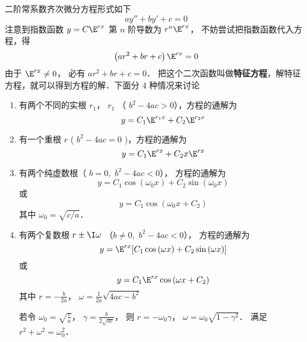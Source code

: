 

二阶常系数齐次微分方程形式如下
\begin{equation}
ay'' + by' + c = 0
\end{equation}
注意到指数函数 $y = C{\E^{rx}}$ 第 $n$ 阶导数为 ${r^n}{\E^{rx}}$， 不妨尝试把指数函数代入方程，得
\begin{equation}
\left( {a{r^2} + br + c} \right){\E^{rx}} = 0
\end{equation}
由于 ${\E^{rx}} \ne 0$， 必有 $a{r^2} + br + c = 0$． 把这个二次函数叫做\textbf{特征方程}，解特征方程，就可以得到方程的解．下面分 $4$ 种情况来讨论

\begin{enumerate}
\item 有两个不同的实根 ${r_1}$，  ${r_1}$ （ ${b^2} - 4ac > 0$），方程的通解为
 \begin{equation}
y = {C_1}{\E^{{r_1}x}} + {C_2}{\E^{{r_2}x}}
\end{equation}
\item 有一个重根 $r$ ( ${b^2} - 4ac = 0$ )，方程的通解为
 \begin{equation}
y = {C_1}{\E^{rx}} + {C_2}x{\E^{rx}}
\end{equation}
\item 有两个纯虚数根（ ${b = 0,\,\,{b^2} - 4ac < 0}$）， 方程的通解为
\begin{equation}
y = {C_1}\cos \left( {{\omega _0}x} \right) + {C_2}\sin \left( {{\omega _0}x} \right)
\end{equation}
或 
\begin{equation}
y = {C_1}\cos \left( {{\omega _0}x + {C_2}} \right)
\end{equation} 
其中 ${\omega _0} = \sqrt {{c}/{a}}$． 

\item 有两个复数根 $r \pm \I\omega $ （${b \ne 0,\,\,{b^2} - 4ac < 0}$）， 方程的通解为
\begin{equation}
y = {\E^{rx}}[ {{C_1}\cos \left( {\omega x} \right) + {C_2}\sin \left( {\omega x} \right)} ]
\end{equation} 
或 
\begin{equation}
y = {C_1}{\E^{rx}}\cos \left( {\omega x + {C_2}} \right)
\end{equation} 
其中 $r =  - \frac{b}{{2a}}$，  $\omega  = \frac{1}{{2a}}\sqrt {4ac - {b^2}} $

若令 ${\omega _0} = \sqrt {\frac{c}{a}} $，  $\gamma  = \frac{b}{{2\sqrt {ac} }}$，  则 $r =  - {\omega _0}\gamma $，  $\omega  = {\omega _0}\sqrt {1 - {\gamma ^2}} $． 满足 ${r^2} + {\omega ^2} = \omega _0^2$． 
\end{enumerate}


















 
